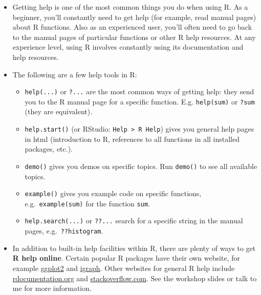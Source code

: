 \documentclass[
]{book}
\providecommand{\tightlist}{%
  \setlength{\itemsep}{0pt}\setlength{\parskip}{0pt}}
\begin{document}
\begin{itemize}
\tightlist
\item
  Getting help is one of the most common things you do when using R. As a beginner, you'll constantly need to get help (for example, read manual pages) about R functions. Also as an experienced user, you'll often need to go back to the manual pages of particular functions or other R help resources. At any experience level, using R involves constantly using its documentation and help resources.
\item
  The following are a few help tools in R:

  \begin{itemize}
  \tightlist
  \item
    \texttt{help(...)} or \texttt{?...} are the most common ways of getting help: they send you to the R manual page for a specific function. E.g. \texttt{help(sum)} or \texttt{?sum} (they are equivalent).
  \item
    \texttt{help.start()} (or RStudio: \texttt{Help\ \textgreater{}\ R\ Help}) gives you general help pages in html (introduction to R, references to all functions in all installed packages, etc.).
  \item
    \texttt{demo()} gives you demos on specific topics. Run \texttt{demo()} to see all available topics.
  \item
    \texttt{example()} gives you example code on specific functions, e.g.~\texttt{example(sum)} for the function \texttt{sum}.\\
  \item
    \texttt{help.search(...)} or \texttt{??...} search for a specific string in the manual pages, e.g.~\texttt{??histogram}.
  \end{itemize}
\item
  In addition to built-in help facilities within R, there are plenty of ways to get \textbf{R help online}. Certain popular R packages have their own website, for example \href{http://ggplot2.tidyverse.org/}{ggplot2} and \href{http://igraph.org/}{igraph}. Other websites for general R help include \href{http://www.rdocumentation.org/}{rdocumentation.org} and \href{http://stackoverflow.com/}{stackoverflow.com}. See the workshop slides or talk to me for more information.
\end{itemize}
\end{document}
